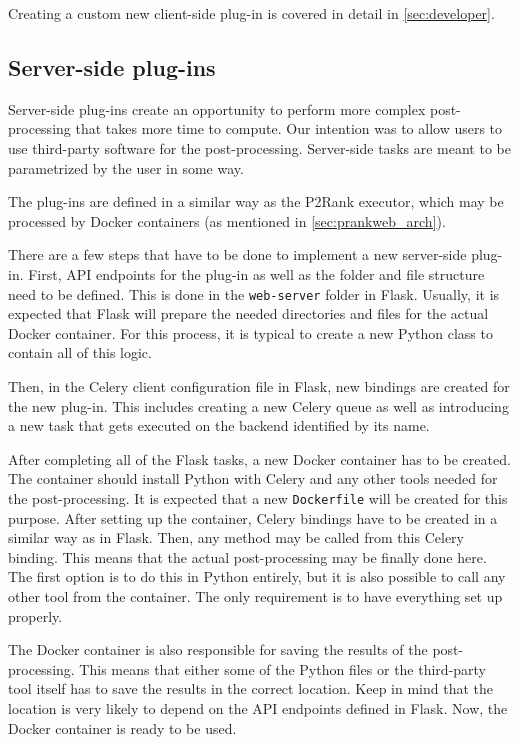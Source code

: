 Creating a custom new client-side plug-in is covered in detail in \cref{sec:developer}.

\subsection{Server-side plug-ins}
\label{subsec:server-side-plugins}

Server-side plug-ins create an opportunity to perform more complex post-processing that takes more time to compute. Our intention was to allow users to use third-party software for the post-processing. Server-side tasks are meant to be parametrized by the user in some way.

The plug-ins are defined in a similar way as the P2Rank executor, which may be processed by Docker containers (as mentioned in \cref{sec:prankweb_arch}).

There are a few steps that have to be done to implement a new server-side plug-in. First, API endpoints for the plug-in as well as the folder and file structure need to be defined. This is done in the \texttt{web-server} folder in Flask. Usually, it is expected that Flask will prepare the needed directories and files for the actual Docker container. For this process, it is typical to create a new Python class to contain all of this logic.

Then, in the Celery client configuration file in Flask, new bindings are created for the new plug-in. This includes creating a new Celery queue as well as introducing a new task that gets executed on the backend identified by its name.

After completing all of the Flask tasks, a new Docker container has to be created. The container should install Python with Celery and any other tools needed for the post-processing. It is expected that a new \texttt{Dockerfile} will be created for this purpose. After setting up the container, Celery bindings have to be created in a similar way as in Flask. Then, any method may be called from this Celery binding. This means that the actual post-processing may be finally done here. The first option is to do this in Python entirely, but it is also possible to call any other tool from the container. The only requirement is to have everything set up properly. 

The Docker container is also responsible for saving the results of the post-processing. This means that either some of the Python files or the third-party tool itself has to save the results in the correct location. Keep in mind that the location is very likely to depend on the API endpoints defined in Flask. Now, the Docker container is ready to be used.

